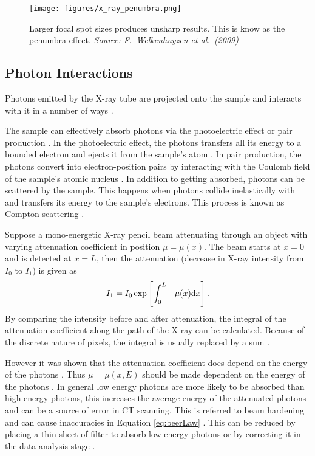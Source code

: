 \begin{figure}
	\centering
	\texttt{[image: figures/x\_ray\_penumbra.png]}
	\caption{Larger focal spot sizes produces unsharp results. This is know as the penumbra effect. \emph{Source: F.~Welkenhuyzen et al.~(2009)\citep{welkenhuyzen2009industrial}}}
	\label{fig:x_ray_penumbra}
\end{figure}

\subsection{Photon Interactions}
Photons emitted by the X-ray tube are projected onto the sample and interacts with it in a number of ways \citep{cantatore2011introduction}.

The sample can effectively absorb photons via the photoelectric effect or pair production \citep{cantatore2011introduction}. In the photoelectric effect, the photons transfers all its energy to a bounded electron and ejects it from the sample's atom \citep{millikan1916direct}. In pair production, the photons convert into electron-position pairs by interacting with the Coulomb field of the sample's atomic nucleus \citep{hubbell2006electron}. In addition to getting absorbed, photons can be scattered by the sample. This happens when photons collide inelastically with and transfers its energy to the sample's electrons. This process is known as Compton scattering \citep{compton1923quantum}.

Suppose a mono-energetic X-ray pencil beam attenuating through an object with varying attenuation coefficient in position $\mu=\mu(x)$. The beam starts at $x=0$ and is detected at $x=L$, then the attenuation (decrease in X-ray intensity from $I_0$ to $I_1$) is given as \citep{cantatore2011introduction}
\begin{equation}
	I_1 = I_0\exp\left[\int_0^L-\mu(x)\mathrm{d} x\right].\label{eq:beerLaw}
\end{equation}
By comparing the intensity before and after attenuation, the integral of the attenuation coefficient along the path of the X-ray can be calculated. Because of the discrete nature of pixels, the integral is usually replaced by a sum \citep{michael2001x}. 

However it was shown that the attenuation coefficient does depend on the energy of the photons \citep{elbakri2002statistical}. Thus $\mu=\mu(x,E)$ should be made dependent on the energy of the photons \citep{cantatore2011introduction}. In general low energy photons are more likely to be absorbed than high energy photons, this increases the average energy of the attenuated photons and can be a source of error in CT scanning. This is referred to beam hardening and can cause inaccuracies in Equation \eqref{eq:beerLaw} \citep{michael2001x}. This can be reduced by placing a thin sheet of filter to absorb low energy photons \citep{welkenhuyzen2009industrial} or by correcting it in the data analysis stage \citep{michael2001x}.


